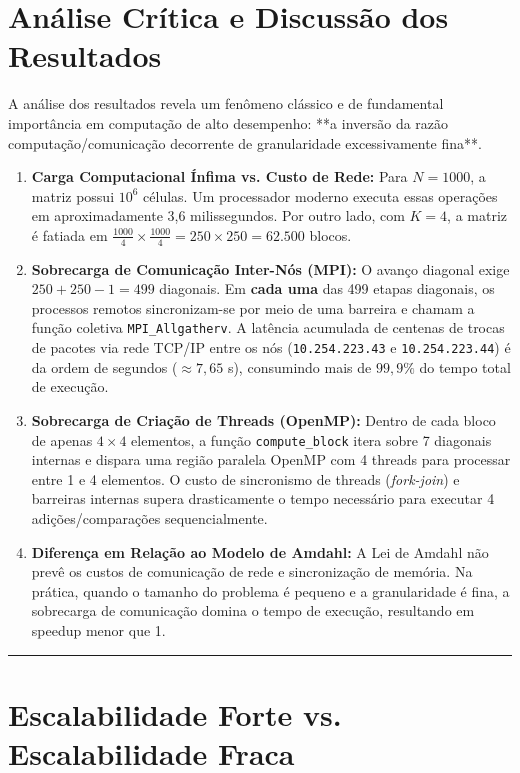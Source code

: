 \documentclass[12pt,a4paper]{article}
\begin{document}
\section{Análise Crítica e Discussão dos Resultados}

A análise dos resultados revela um fenômeno clássico e de fundamental importância em computação de alto desempenho: **a inversão da razão computação/comunicação decorrente de granularidade excessivamente fina**.

\begin{enumerate}
    \item \textbf{Carga Computacional Ínfima vs. Custo de Rede:} Para $N = 1000$, a matriz possui $10^6$ células. Um processador moderno executa essas operações em aproximadamente 3,6 milissegundos. Por outro lado, com $K = 4$, a matriz é fatiada em $\frac{1000}{4} \times \frac{1000}{4} = 250 \times 250 = 62.500$ blocos.
    \item \textbf{Sobrecarga de Comunicação Inter-Nós (MPI):} O avanço diagonal exige $250 + 250 - 1 = 499$ diagonais. Em \textbf{cada uma} das 499 etapas diagonais, os processos remotos sincronizam-se por meio de uma barreira e chamam a função coletiva \texttt{MPI\_Allgatherv}. A latência acumulada de centenas de trocas de pacotes via rede TCP/IP entre os nós (\texttt{10.254.223.43} e \texttt{10.254.223.44}) é da ordem de segundos ($\approx 7{,}65$ s), consumindo mais de $99{,}9\%$ do tempo total de execução.
    \item \textbf{Sobrecarga de Criação de Threads (OpenMP):} Dentro de cada bloco de apenas $4 \times 4$ elementos, a função \texttt{compute\_block} itera sobre 7 diagonais internas e dispara uma região paralela OpenMP com 4 threads para processar entre 1 e 4 elementos. O custo de sincronismo de threads (\textit{fork-join}) e barreiras internas supera drasticamente o tempo necessário para executar 4 adições/comparações sequencialmente.
    \item \textbf{Diferença em Relação ao Modelo de Amdahl:} A Lei de Amdahl não prevê os custos de comunicação de rede e sincronização de memória. Na prática, quando o tamanho do problema é pequeno e a granularidade é fina, a sobrecarga de comunicação domina o tempo de execução, resultando em speedup menor que 1.
\end{enumerate}

\vspace{0.5cm}
\hrule
\vspace{0.5cm}

\section{Escalabilidade Forte vs. Escalabilidade Fraca}
\end{document}
